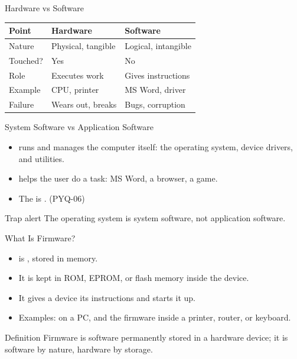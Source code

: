 \documentclass[aspectratio=169]{beamer}
\begin{document}
\begin{frame}{Hardware vs Software}
  \begin{center}
    \begin{tabular}{p{}p{}p{}}
      \toprule
      \textbf{Point} & \textbf{Hardware} & \textbf{Software} \\
      \midrule
      Nature & Physical, tangible & Logical, intangible \\
      Touched? & Yes & No \\
      Role & Executes work & Gives instructions \\
      Example & CPU, printer & MS Word, driver \\
      Failure & Wears out, breaks & Bugs, corruption \\
      \bottomrule
    \end{tabular}
  \end{center}
  \vspace{0.15cm}
\end{frame}

\begin{frame}{System Software vs Application Software}
  \begin{itemize}
    \item {} runs and manages the computer itself: the
      operating system, device drivers, and utilities.
    \item {} helps the user do a task: MS Word, a
      browser, a game.
    \item The  is . (PYQ-06)
  \end{itemize}
  \begin{alertblock}{Trap alert}
    The operating system is system software, not application software.
  \end{alertblock}
\end{frame}

\begin{frame}{What Is Firmware?}
  \begin{itemize}
    \item {} is , stored in
       memory.
    \item It is kept in ROM, EPROM, or flash memory inside the device.
    \item It gives a device its  instructions and
      starts it up.
    \item Examples:  on a PC, and the firmware inside a
      printer, router, or keyboard.
  \end{itemize}
  \begin{block}{Definition}
    Firmware is software permanently stored in a hardware device; it is
    software by nature, hardware by storage.
  \end{block}
\end{frame}
\end{document}
